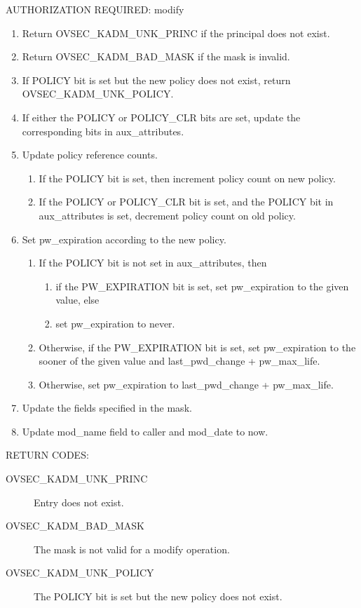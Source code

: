 AUTHORIZATION REQUIRED: modify

\begin{enumerate}
\item Return OVSEC_KADM_UNK_PRINC if the principal does not exist.
\item Return OVSEC_KADM_BAD_MASK if the mask is invalid.
\item If POLICY bit is set but the new policy does not exist, return
OVSEC_KADM_UNK_POLICY.
\item If either the POLICY or POLICY_CLR bits are set, update the
corresponding bits in aux_attributes.

\item Update policy reference counts.
\begin{enumerate}
\item If the POLICY bit is set, then increment policy count on new
policy.
\item If the POLICY or POLICY_CLR bit is set, and the POLICY bit in
aux_attributes is set, decrement policy count on old policy.
\end{enumerate}

\item Set pw_expiration according to the new policy.
\begin{enumerate}
\item If the POLICY bit is not set in aux_attributes, then
\begin{enumerate}
\item if the PW_EXPIRATION bit is set, set pw_expiration to the given
value, else
\item set pw_expiration to never.
\end{enumerate}
\item Otherwise, if the PW_EXPIRATION bit is set, set pw_expiration to
the sooner of the given value and last_pwd_change + pw_max_life.
\item Otherwise, set pw_expiration to last_pwd_change + pw_max_life.
\end{enumerate}

\item Update the fields specified in the mask.
\item Update mod_name field to caller and mod_date to now.
\end{enumerate}

RETURN CODES:

\begin{description}
\item[OVSEC_KADM_UNK_PRINC] Entry does not exist.
\item[OVSEC_KADM_BAD_MASK] The mask is not valid for a modify
operation.
\item[OVSEC_KADM_UNK_POLICY] The POLICY bit is set but the new
policy does not exist.
\end{description}

